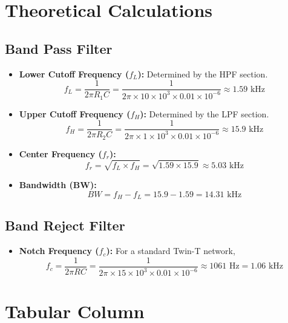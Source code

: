 \documentclass[12pt,a4paper]{article}
\begin{document}
\section{Theoretical Calculations}
\subsection{Band Pass Filter}
\begin{itemize}
    \item \textbf{Lower Cutoff Frequency ($f_L$):} Determined by the HPF section.
    $$f_L = \frac{1}{2\pi R_1 C} = \frac{1}{2\pi \times 10 \times 10^3 \times 0.01 \times 10^{-6}} \approx 1.59 \text{ kHz}$$
    \item \textbf{Upper Cutoff Frequency ($f_H$):} Determined by the LPF section.
    $$f_H = \frac{1}{2\pi R_2 C} = \frac{1}{2\pi \times 1 \times 10^3 \times 0.01 \times 10^{-6}} \approx 15.9 \text{ kHz}$$
    \item \textbf{Center Frequency ($f_r$):}
    $$f_r = \sqrt{f_L \times f_H} = \sqrt{1.59 \times 15.9} \approx 5.03 \text{ kHz}$$
    \item \textbf{Bandwidth (BW):}
    $$BW = f_H - f_L = 15.9 - 1.59 = 14.31 \text{ kHz}$$
\end{itemize}

\subsection{Band Reject Filter}
\begin{itemize}
    \item \textbf{Notch Frequency ($f_c$):} For a standard Twin-T network,
    $$f_c = \frac{1}{2\pi R C} = \frac{1}{2\pi \times 15 \times 10^3 \times 0.01 \times 10^{-6}} \approx 1061 \text{ Hz} = 1.06 \text{ kHz}$$
\end{itemize}

\section{Tabular Column}
\end{document}
